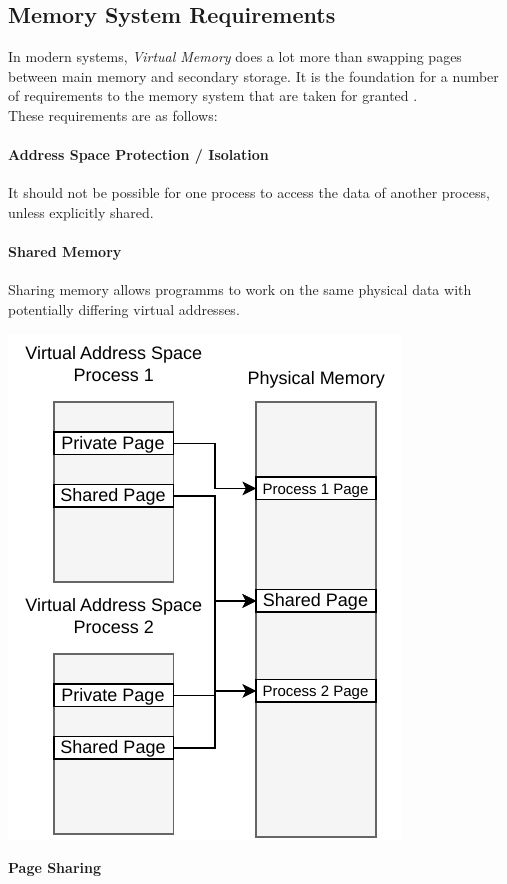 \subsection{Memory System Requirements}
In modern systems, \textit{Virtual Memory} does a lot more than swapping pages between main memory and secondary
storage. It is the foundation for a number of requirements to the memory system that are taken for granted
\cite{jacobSoftwaremanagedAddressTranslation1997}.\\
These requirements are as follows:


\paragraph{Address Space Protection / Isolation} It should not be possible for one process to access the data
of another process, unless explicitly shared.
\cite{jacobVirtualMemoryContemporary1998}


\paragraph{Shared Memory} Sharing memory allows programms to work on the same physical data with potentially
differing virtual addresses.
\cite{jacobVirtualMemoryContemporary1998}

\begin{marginfigure}
    \includegraphics*[width=1\marginparwidth]{figures/fund_share.pdf}
    \caption{\textbf{Page Sharing}}
\end{marginfigure}


